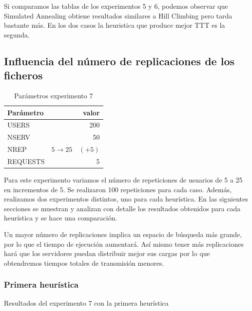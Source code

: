 Si comparamos las tablas de los experimentos 5 y 6, podemos observar que Simulated Annealing
obtiene resultados similares a Hill Climbing pero tarda bastante más. En los dos casos
la heuristica que produce mejor TTT es la segunda.



\pagebreak
\subsection{Influencia del número de replicaciones de los ficheros}%
\label{sub:exp7}

\begin{table}[H]
    \caption{Parámetros experimento 7}%
    \label{tab:ex7_par}
    \begin{center}
    \begin{tabular}{lr}
    \toprule
    Parámetro & valor \\
    \midrule
    USERS & 200 \\
    NSERV & 50 \\
    NREP & $5 \to 25 \quad (+5)$ \\
    REQUESTS & 5\\
    \bottomrule
    \end{tabular}
    \end{center}
\end{table}

Para este experimento variamos el número de repeticiones de usuarios de 5 a 25 en incrementos de 5. Se realizaron 100
repeticiones para cada caso. Además, realizamos dos experimentos distintos, uno para cada heurística. En las
siguientes secciones se muestran y analizan con detalle los resultados obtenidos para cada heurística y se hace una
comparación.

\begin{hyp*}
    Un mayor número de replicaciones implica un espacio de búsqueda más grande, por lo que el tiempo de ejecución
    aumentará. Así mismo tener más replicaciones hará que los servidores puedan distribuir mejor sus cargas por
    lo que obtendremos tiempos totales de transmisión menores.
\end{hyp*}

\subsubsection{Primera heurística}
\begin{table}[H]
    \centering
    \caption{Resultados del experimento 7 con la primera heurística}%
    \label{tab:ex7}
    \begin{center}
    
    \end{center}
\end{table}

